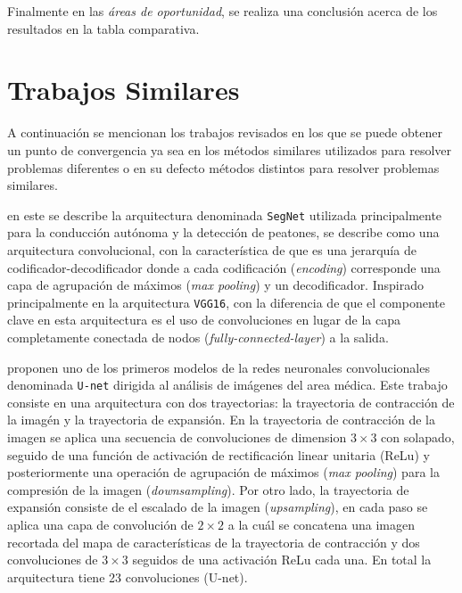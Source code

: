 Finalmente en las \emph{áreas de oportunidad}, se realiza una conclusión acerca de los resultados en la tabla comparativa.

\section{Trabajos Similares}

A continuación se mencionan los trabajos revisados en los que se puede obtener un punto de convergencia ya sea en los métodos similares utilizados para resolver problemas diferentes o en su defecto métodos distintos para resolver problemas similares.

\citet{DBLP:journals/corr/BadrinarayananK15} en este se describe la arquitectura denominada \texttt{SegNet} utilizada principalmente para la conducción autónoma y la detección de peatones, se describe como una arquitectura convolucional, con la característica de que es una jerarquía de codificador-decodificador donde a cada codificación (\emph{encoding}) corresponde una capa de agrupación de máximos (\emph{max pooling}) y un decodificador. Inspirado principalmente en la arquitectura \texttt{VGG16}, con la diferencia de que el componente clave en esta arquitectura es el uso de convoluciones en lugar de la capa completamente conectada de nodos (\emph{fully-connected-layer}) a la salida.

\citet{DBLP:journals/corr/RonnebergerFB15} proponen uno de los primeros modelos de la redes neuronales convolucionales denominada \texttt{U-net} dirigida al análisis de imágenes del area médica. Este trabajo consiste en una arquitectura con dos trayectorias: la trayectoria de contracción de la imagén y la trayectoria de expansión. En la trayectoria de contracción de la imagen se aplica una secuencia de convoluciones de dimension $3 \times 3$ con solapado, seguido de una función de activación de rectificación linear unitaria (ReLu) y posteriormente una operación de agrupación de máximos (\emph{max pooling}) para la compresión de la imagen (\emph{downsampling}). Por otro lado, la trayectoria de expansión consiste de el escalado de la imagen (\emph{upsampling}), en cada paso se aplica una capa de convolución de $2 \times 2$ a la cuál se concatena una imagen recortada del mapa de características de la trayectoria de contracción y dos convoluciones de $3 \times 3$ seguidos de una activación ReLu cada una. En total la arquitectura tiene 23 convoluciones (U-net).


